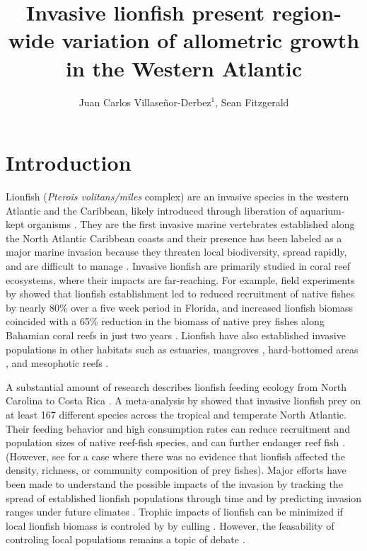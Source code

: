 \documentclass[fleqn,10pt,lineno]{wlpeerj} %
\title{Invasive lionfish present region-wide variation of allometric growth in
the Western Atlantic}
\author[1]{Juan Carlos Villaseñor-Derbez\(^1\), Sean Fitzgerald}
\affil[1]{Bren School of Environmental Sciences and Management, University of
California Santa Barbara, Santa Barbara, California, USA}
\begin{document}
\flushbottom
\maketitle
\thispagestyle{empty}

\section*{Introduction}

Lionfish (\emph{Pterois volitans/miles} complex) are an invasive species
in the western Atlantic and the Caribbean, likely introduced through
liberation of aquarium-kept organisms \citep{betancurr_2011}. They are
the first invasive marine vertebrates established along the North
Atlantic Caribbean coasts
\citep{schofield_2009,schofield_2010,sabidoitza_2016} and their presence
has been labeled as a major marine invasion because they threaten local
biodiversity, spread rapidly, and are difficult to manage
\citep{hixon_2016}. Invasive lionfish are primarily studied in coral
reef ecosystems, where their impacts are far-reaching. For example,
field experiments by \citet{albins_2008} showed that lionfish
establishment led to reduced recruitment of native fishes by nearly 80\%
over a five week period in Florida, and increased lionfish biomass
coincided with a 65\% reduction in the biomass of native prey fishes
along Bahamian coral reefs in just two years \citep{green_2012}.
Lionfish have also established invasive populations in other habitats
such as estuaries, mangroves , hard-bottomed areas , and mesophotic
reefs
\citep{jud_2011,barbour_2010,muoz_2011,andradibrown_2017,claydon_2012}.

A substantial amount of research describes lionfish feeding ecology from
North Carolina to Costa Rica
\citep{muoz_2011,morris_2009,cote_2013,dahl_2014,valdezmoreno_2012,villaseorderbez_2014,hackerott_2017,sandel_2015}.
A meta-analysis by \citet{peake_2018} showed that invasive lionfish prey
on at least 167 different species across the tropical and temperate
North Atlantic. Their feeding behavior and high consumption rates can
reduce recruitment and population sizes of native reef-fish species, and
can further endanger reef fish
\citep{albins_2008, green_2012,rocha_2015}. (However, see
\citet{hackerott_2017} for a case where there was no evidence that
lionfish affected the density, richness, or community composition of
prey fishes). Major efforts have been made to understand the possible
impacts of the invasion by tracking the spread of established lionfish
populations through time \citep{schofield_2009,schofield_2010} and by
predicting invasion ranges under future climates \citep{grieve_2016}.
Trophic impacts of lionfish can be minimized if local lionfish biomass
is controled by by culling \citep{ariasgonzalez_2011}. However, the
feasability of controling local populations remains a topic of debate
\citep{cote_2014}.
\end{document}
